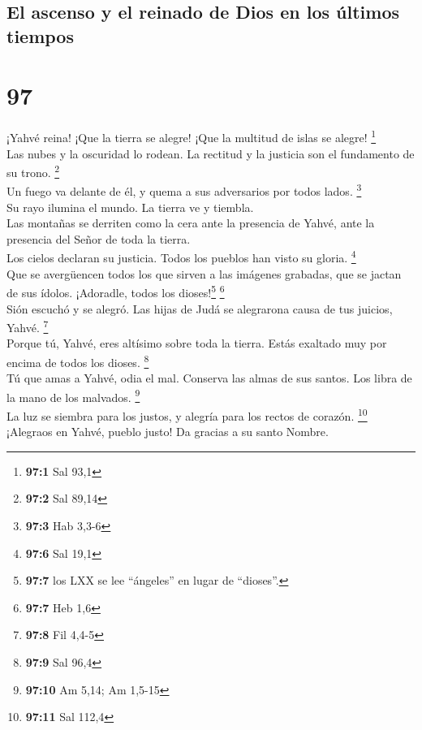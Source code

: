 \hypertarget{el-ascenso-y-el-reinado-de-dios-en-los-uxfaltimos-tiempos}{%
\subsection{El ascenso y el reinado de Dios en los últimos
tiempos}\label{el-ascenso-y-el-reinado-de-dios-en-los-uxfaltimos-tiempos}}

\hypertarget{section-94}{%
\section{97}\label{section-94}}

 ¡Yahvé reina! ¡Que la tierra se alegre! ¡Que la multitud
de islas se alegre! \footnote{\textbf{97:1} Sal 93,1}\\
 Las nubes y la oscuridad lo rodean. La rectitud y la
justicia son el fundamento de su trono. \footnote{\textbf{97:2} Sal
  89,14}\\
 Un fuego va delante de él, y quema a sus adversarios por
todos lados. \footnote{\textbf{97:3} Hab 3,3-6}\\
 Su rayo ilumina el mundo. La tierra ve y tiembla.\\
 Las montañas se derriten como la cera ante la presencia
de Yahvé, ante la presencia del Señor de toda la tierra.\\
 Los cielos declaran su justicia. Todos los pueblos han
visto su gloria. \footnote{\textbf{97:6} Sal 19,1}\\
 Que se avergüencen todos los que sirven a las imágenes
grabadas, que se jactan de sus ídolos. ¡Adoradle, todos los
dioses!\footnote{\textbf{97:7} los LXX se lee ``ángeles'' en lugar de
  ``dioses''.} \footnote{\textbf{97:7} Heb 1,6}\\
 Sión escuchó y se alegró. Las hijas de Judá se alegrarona
causa de tus juicios, Yahvé. \footnote{\textbf{97:8} Fil 4,4-5}\\
 Porque tú, Yahvé, eres altísimo sobre toda la tierra.
Estás exaltado muy por encima de todos los dioses. \footnote{\textbf{97:9}
  Sal 96,4}\\
 Tú que amas a Yahvé, odia el mal. Conserva las almas de
sus santos. Los libra de la mano de los malvados. \footnote{\textbf{97:10}
  Am 5,14; Am 1,5-15}\\
 La luz se siembra para los justos, y alegría para los
rectos de corazón. \footnote{\textbf{97:11} Sal 112,4}\\
 ¡Alegraos en Yahvé, pueblo justo! Da gracias a su santo
Nombre.

